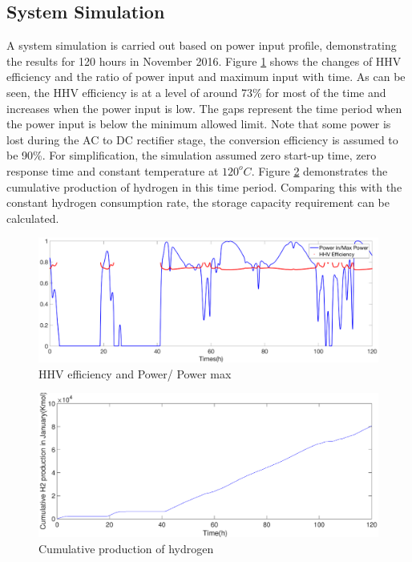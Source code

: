 \documentclass[11pt, a4paper]{article}
\begin{document}
\subsection{System Simulation}
A system simulation is carried out based on power input profile,  demonstrating the results for 120 hours in November 2016.  Figure \ref{fig:simulation}  shows the changes of  HHV efficiency and the ratio of power input and maximum input with time. As can be seen, the HHV efficiency is at a level of around 73\% for most of the time and increases when the power input is low. The gaps represent the time period when the power input is below the minimum allowed limit. Note that some power is lost during the AC to DC rectifier stage, the conversion efficiency is assumed to be 90\%. For simplification, the simulation assumed zero start-up time, zero response time and constant temperature at $120^oC$. Figure \ref{cumulative} demonstrates the cumulative production of hydrogen in this time period. Comparing this with the constant hydrogen consumption rate, the storage capacity requirement can be calculated. 
\begin{figure}[htb]
\centering
\includegraphics[width = 18cm]{simulation.eps}
\caption{HHV efficiency and Power/ Power max}
\label{fig:simulation}
\end{figure}

\begin{figure}[htb]
\centering
\includegraphics[width = 17cm]{cumulative.eps}
\caption{Cumulative production of hydrogen }
\label{cumulative}
\end{figure}
\end{document}
